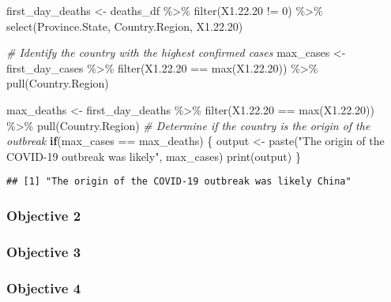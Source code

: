 \documentclass[
]{article}
\newenvironment{Shaded}{\begin{snugshade}}{\end{snugshade}}
\newcommand{\CommentTok}[1]{\textcolor[rgb]{0.56,0.35,0.01}{\textit{#1}}}
\newcommand{\ControlFlowTok}[1]{\textcolor[rgb]{0.13,0.29,0.53}{\textbf{#1}}}
\newcommand{\DecValTok}[1]{\textcolor[rgb]{0.00,0.00,0.81}{#1}}
\newcommand{\FloatTok}[1]{\textcolor[rgb]{0.00,0.00,0.81}{#1}}
\newcommand{\FunctionTok}[1]{\textcolor[rgb]{0.00,0.00,0.00}{#1}}
\newcommand{\NormalTok}[1]{#1}
\newcommand{\OtherTok}[1]{\textcolor[rgb]{0.56,0.35,0.01}{#1}}
\newcommand{\SpecialCharTok}[1]{\textcolor[rgb]{0.00,0.00,0.00}{#1}}
\newcommand{\StringTok}[1]{\textcolor[rgb]{0.31,0.60,0.02}{#1}}
\begin{document}
\begin{Shaded}
\begin{Highlighting}[]
\NormalTok{first\_day\_deaths }\OtherTok{\textless{}{-}}\NormalTok{ deaths\_df }\SpecialCharTok{\%\textgreater{}\%}
  \FunctionTok{filter}\NormalTok{(X1.}\FloatTok{22.20} \SpecialCharTok{!=} \DecValTok{0}\NormalTok{) }\SpecialCharTok{\%\textgreater{}\%}
  \FunctionTok{select}\NormalTok{(Province.State, Country.Region, X1.}\FloatTok{22.20}\NormalTok{)}

\CommentTok{\# Identify the country with the highest confirmed cases}
\NormalTok{max\_cases }\OtherTok{\textless{}{-}}\NormalTok{ first\_day\_cases }\SpecialCharTok{\%\textgreater{}\%}
  \FunctionTok{filter}\NormalTok{(X1.}\FloatTok{22.20} \SpecialCharTok{==} \FunctionTok{max}\NormalTok{(X1.}\FloatTok{22.20}\NormalTok{)) }\SpecialCharTok{\%\textgreater{}\%}
  \FunctionTok{pull}\NormalTok{(Country.Region)}

\NormalTok{max\_deaths }\OtherTok{\textless{}{-}}\NormalTok{ first\_day\_deaths }\SpecialCharTok{\%\textgreater{}\%}
  \FunctionTok{filter}\NormalTok{(X1.}\FloatTok{22.20} \SpecialCharTok{==} \FunctionTok{max}\NormalTok{(X1.}\FloatTok{22.20}\NormalTok{)) }\SpecialCharTok{\%\textgreater{}\%}
  \FunctionTok{pull}\NormalTok{(Country.Region)}
\CommentTok{\# Determine if the country is the origin of the outbreak}
\ControlFlowTok{if}\NormalTok{(max\_cases }\SpecialCharTok{==}\NormalTok{ max\_deaths) \{}
\NormalTok{  output }\OtherTok{\textless{}{-}} \FunctionTok{paste}\NormalTok{(}\StringTok{"The origin of the COVID{-}19 outbreak was likely"}\NormalTok{, max\_cases)}
  \FunctionTok{print}\NormalTok{(output)}
\NormalTok{\}}
\end{Highlighting}
\end{Shaded}

\begin{verbatim}
## [1] "The origin of the COVID-19 outbreak was likely China"
\end{verbatim}

\hypertarget{objective-2}{%
\subsubsection{Objective 2}\label{objective-2}}

\hypertarget{objective-3}{%
\subsubsection{Objective 3}\label{objective-3}}

\hypertarget{objective-4}{%
\subsubsection{Objective 4}\label{objective-4}}
\end{document}
